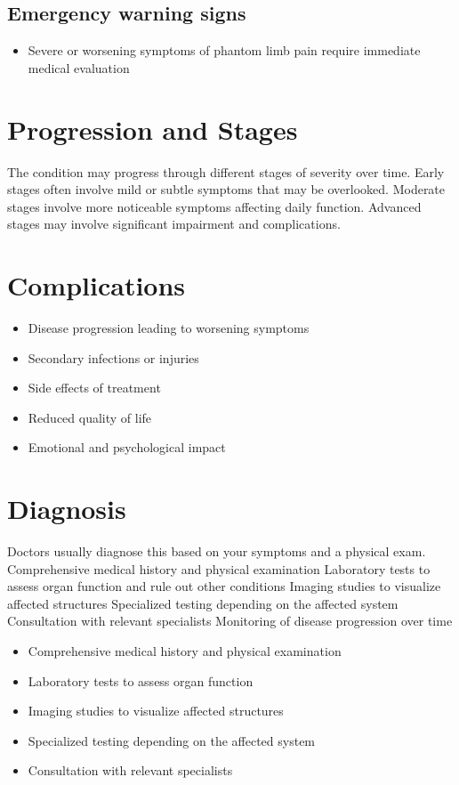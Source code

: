 \subsection{Emergency warning signs}
\begin{itemize}[noitemsep]
  \item Severe or worsening symptoms of phantom limb pain require immediate medical evaluation
\end{itemize}
\section{Progression and Stages}
The condition may progress through different stages of severity over time. Early stages often involve mild or subtle symptoms that may be overlooked. Moderate stages involve more noticeable symptoms affecting daily function. Advanced stages may involve significant impairment and complications.
\section{Complications}
\begin{itemize}[noitemsep]
  \item Disease progression leading to worsening symptoms
  \item Secondary infections or injuries
  \item Side effects of treatment
  \item Reduced quality of life
  \item Emotional and psychological impact
\end{itemize}
\section{Diagnosis}
Doctors usually diagnose this based on your symptoms and a physical exam. Comprehensive medical history and physical examination Laboratory tests to assess organ function and rule out other conditions Imaging studies to visualize affected structures Specialized testing depending on the affected system Consultation with relevant specialists Monitoring of disease progression over time

\begin{itemize}[noitemsep]
  \item Comprehensive medical history and physical examination
  \item Laboratory tests to assess organ function
  \item Imaging studies to visualize affected structures
  \item Specialized testing depending on the affected system
  \item Consultation with relevant specialists
\end{itemize}
